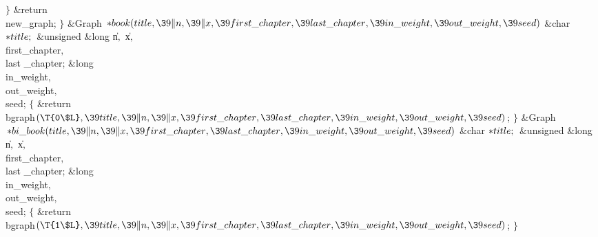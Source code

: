 \4${}\}{}$\2\6
\&{return} \\{new\_graph};\6
\4${}\}{}$\2\7
\1\1\&{Graph} ${}{*}\\{book}(\\{title},\39\|n,\39\|x,\39\\{first\_chapter},\39%
\\{last\_chapter},\39\\{in\_weight},\39\\{out\_weight},\39\\{seed}){}$\6
\&{char} ${}{*}\\{title};{}$\6
\&{unsigned} \&{long} \|n${},{}$ \|x${},{}$ \\{first\_chapter}${},{}$ \\{last%
\_chapter};\6
\&{long} \\{in\_weight}${},{}$ \\{out\_weight}${},{}$ \\{seed};\2\2\6
${}\{{}$\5
\1\&{return} \\{bgraph}${}(\T{0\$L},\39\\{title},\39\|n,\39\|x,\39\\{first%
\_chapter},\39\\{last\_chapter},\39\\{in\_weight},\39\\{out\_weight},\39%
\\{seed}){}$;\5
${}\}{}$\2\7
\1\1\&{Graph} ${}{*}\\{bi\_book}(\\{title},\39\|n,\39\|x,\39\\{first\_chapter},%
\39\\{last\_chapter},\39\\{in\_weight},\39\\{out\_weight},\39\\{seed}){}$\6
\&{char} ${}{*}\\{title};{}$\6
\&{unsigned} \&{long} \|n${},{}$ \|x${},{}$ \\{first\_chapter}${},{}$ \\{last%
\_chapter};\6
\&{long} \\{in\_weight}${},{}$ \\{out\_weight}${},{}$ \\{seed};\2\2\6
${}\{{}$\5
\1\&{return} \\{bgraph}${}(\T{1\$L},\39\\{title},\39\|n,\39\|x,\39\\{first%
\_chapter},\39\\{last\_chapter},\39\\{in\_weight},\39\\{out\_weight},\39%
\\{seed}){}$;\5
${}\}{}$\2\par
\fi

